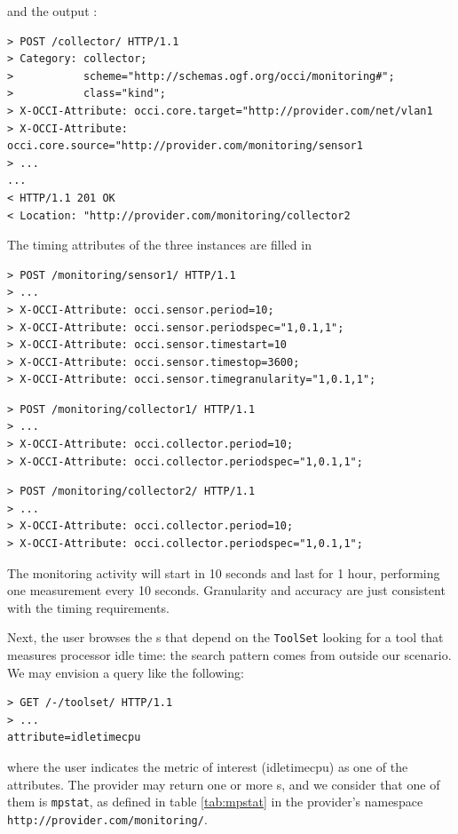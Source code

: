 \documentclass[12pt]{article}  %
\begin{document}
and the output \coll:

\begin{verbatim}
> POST /collector/ HTTP/1.1
> Category: collector;
>           scheme="http://schemas.ogf.org/occi/monitoring#";
>           class="kind";
> X-OCCI-Attribute: occi.core.target="http://provider.com/net/vlan1
> X-OCCI-Attribute: occi.core.source="http://provider.com/monitoring/sensor1
> ...
...
< HTTP/1.1 201 OK
< Location: "http://provider.com/monitoring/collector2
\end{verbatim}

The timing attributes of the three instances are filled in

\begin{verbatim}
> POST /monitoring/sensor1/ HTTP/1.1
> ...
> X-OCCI-Attribute: occi.sensor.period=10;
> X-OCCI-Attribute: occi.sensor.periodspec="1,0.1,1";
> X-OCCI-Attribute: occi.sensor.timestart=10
> X-OCCI-Attribute: occi.sensor.timestop=3600;
> X-OCCI-Attribute: occi.sensor.timegranularity="1,0.1,1";
\end{verbatim}

\begin{verbatim}
> POST /monitoring/collector1/ HTTP/1.1
> ...
> X-OCCI-Attribute: occi.collector.period=10;
> X-OCCI-Attribute: occi.collector.periodspec="1,0.1,1";
\end{verbatim}

\begin{verbatim}
> POST /monitoring/collector2/ HTTP/1.1
> ...
> X-OCCI-Attribute: occi.collector.period=10;
> X-OCCI-Attribute: occi.collector.periodspec="1,0.1,1";
\end{verbatim}

The monitoring activity will start in 10 seconds and last for 1 hour, performing one measurement every 10 seconds. Granularity and accuracy are just consistent with the timing requirements.

Next, the user browses the \mi s that depend on the {\tt ToolSet} \mi looking for a tool that measures processor idle time: the search pattern comes from outside our scenario. We may envision a query like the following:

\begin{verbatim}
> GET /-/toolset/ HTTP/1.1
> ...
attribute=idletimecpu
\end{verbatim}

where the user indicates the metric of interest (idletimecpu) as one of the attributes. The provider may return one or more \mi s, and we consider that one of them is {\tt mpstat}, as defined in table \ref{tab:mpstat} in the provider's namespace {\tt http://provider.com/monitoring/}.
\end{document}
